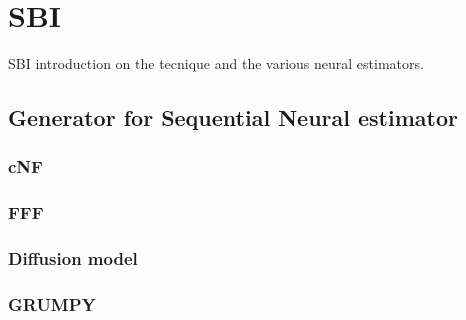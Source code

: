 \chapter{SBI}

SBI introduction on the tecnique and the various neural estimators. 

\section{Generator for Sequential Neural estimator}
\subsection{cNF}
\subsection{FFF}
\subsection{Diffusion model}
\subsection{GRUMPY}
